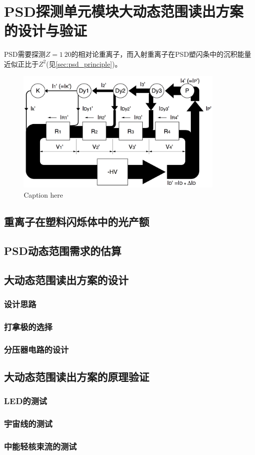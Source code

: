 \chapter{PSD探测单元模块大动态范围读出方案的设计与验证}
\label{ch:large_dynmaicrange}
PSD需要探测$Z=1~20$的相对论重离子，而入射重离子在PSD塑闪条中的沉积能量近似正比于$Z^2$(见\ref{sec:psd_principle})。
\begin{figure}[tb]
	\centering
	\includegraphics[width=0.9\textwidth]{chap/dynamic_range/fig/pmt_current_distribution_hamamatsu}
	\caption{Caption here}
	\label{fig:figure1}
\end{figure}
\section{重离子在塑料闪烁体中的光产额}
\label{sec:ch3:light_yield}

\section{PSD动态范围需求的估算}

\section{大动态范围读出方案的设计}
\subsection{设计思路}
\subsection{打拿极的选择}
\subsection{分压器电路的设计}

\section{大动态范围读出方案的原理验证}
\subsection{LED的测试}
\subsection{宇宙线的测试}
\subsection{中能轻核束流的测试}
